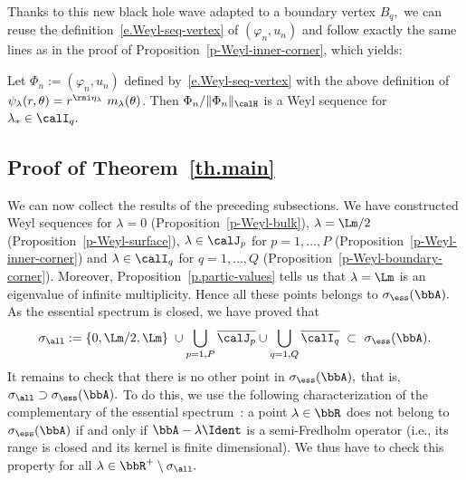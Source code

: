 Thanks to this new black hole wave adapted to a boundary vertex $B_q,$ we can reuse the definition~\eqref{e.Weyl-seq-vertex} of $(\varphi_n,u_n)$ and follow exactly the same lines as in the proof of Proposition~\ref{p-Weyl-inner-corner}, which yields:

\begin{prop}\label{p-Weyl-boundary-corner}
Let $\Phi_n := (\varphi_n,u_n)$ defined by~\eqref{e.Weyl-seq-vertex} with the above definition of $\psi_\lambda(r,\theta) = r^{\rmi\eta_\lambda}\ m_\lambda(\theta)$. Then $\Phi_n/\|\Phi_n\|_\calH$ is a Weyl sequence for $\lambda_* \in \calI_q.$
\end{prop}

\subsection{Proof of Theorem~\ref{th.main}}\label{s.proof-thm}
We can now collect the results of the preceding subsections. We have constructed Weyl sequences for $\lambda = 0$ (Proposition~\ref{p-Weyl-bulk}), $\lambda = \Lm/2$ (Proposition~\ref{p-Weyl-surface}), $\lambda \in \calJ_p$ for $p=1,\ldots,P$ (Proposition~\ref{p-Weyl-inner-corner}) and $\lambda \in \calI_q$ for $q=1,\ldots,Q$ (Proposition~\ref{p-Weyl-boundary-corner}). Moreover, Proposition~\ref{p.partic-values} tells us that $\lambda = \Lm$ is an eigenvalue of infinite multiplicity. Hence all these points belongs to $\sigma_{\ess}(\bbA).$ As the essential spectrum is closed, we have proved that
\[
\sigma_{\all} := \left\{0,\Lm/2,\Lm\right\} \; \cup \bigcup_{p=1,P} \overline{\calJ_p} \cup \bigcup_{q=1,Q} \overline{\calI_q} \; \subset\ \sigma_{\ess}(\bbA).
\]
It remains to check that there is no other point in $\sigma_{\ess}(\bbA),$ that is, $\sigma_{\all} \supset \sigma_{\ess}(\bbA).$ To do this, we use the following characterization of the complementary of the essential spectrum~\cite{Edm-Eva-87}: a point $\lambda \in \bbR$ does not belong to $\sigma_{\ess}(\bbA)$ if and only if $\bbA - \lambda \Ident$ is a semi-Fredholm operator (i.e., its range is closed and its kernel is finite dimensional). We thus have to check this property for all $\lambda \in \bbR^{+}\setminus\sigma_{\all}.$

